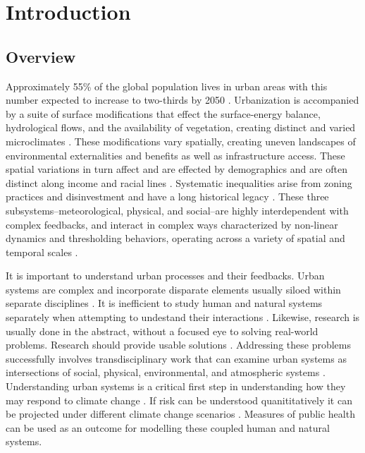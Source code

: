 
\section{Introduction}

\subsection{Overview}
Approximately 55\% of the global population lives in urban areas with this number expected to increase to two-thirds by 2050 \citep{UnitedNations2019}.
Urbanization is accompanied by a suite of surface modifications that effect the surface-energy balance, hydrological flows, and the availability of vegetation, creating distinct and varied microclimates \citep{Pickett2001}.
These modifications vary spatially, creating uneven landscapes of environmental externalities and benefits as well as infrastructure access.
These spatial variations in turn affect and are effected by demographics and are often distinct along income and racial lines \citep{Heynan2006}.
Systematic inequalities arise from zoning practices and disinvestment and have a long historical legacy \citep{Wolch2014}.
These three subsystems–meteorological, physical, and social–are highly interdependent with complex feedbacks, and interact in complex ways characterized by non-linear dynamics and thresholding behaviors, operating across a variety of spatial and temporal scales \citep{Liu2007,Liu2007a,McPhearson2016}.

It is important to understand urban processes and their feedbacks.
Urban systems are complex and incorporate disparate elements usually siloed within separate disciplines \citep{Bai2018}.
It is inefficient to study human and natural systems separately when attempting to undestand their interactions \citep{Liu2007a}.
Likewise, research is usually done in the abstract, without a focused eye to solving real-world problems. Research should provide usable solutions \citep{Liu2007a,McPhearson2016}.
Addressing these problems successfully involves transdisciplinary work that can examine urban systems as intersections of social, physical, environmental, and atmospheric systems \citep{Bai2018,McPhearson2016}.
Understanding urban systems is a critical first step in understanding how they may respond to climate change \citep{Bai2018}.
If risk can be understood quanititatively it can be projected under different climate change scenarios \citep{McMichael2012}.
Measures of public health can be used as an outcome for modelling these coupled human and natural systems.

